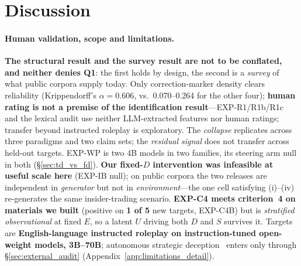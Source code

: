 \section{Discussion}
\label{sec:discussion}

\paragraph{Human validation, scope and limitations.}
\label{sec:icc_caveat}
\label{sec:icc_owned}
\label{sec:transfer_regimes}
\label{sec:blackbox_vs_whitebox}
\label{sec:haiku_defensiveness}
\label{sec:novelty}
\label{sec:protocol_generality}
\label{sec:loo_across_models}
\label{sec:limitations}
\label{sec:interrogation_role}
\label{sec:deployment}
\textbf{The structural result and the survey result are not to be conflated, and neither denies Q1}: the first holds by design, the second is a \emph{survey} of what public corpora supply today. Only correction-marker density clears reliability (Krippendorff's $\alpha\!=\!0.606$, vs.\ 0.070--0.264 for the other four); \textbf{human rating is not a premise of the identification result}---EXP-R1/R1b/R1c and the lexical audit use neither LLM-extracted features nor human ratings; transfer beyond instructed roleplay is exploratory. The \emph{collapse} replicates across three paradigms and two claim sets; the \emph{residual signal} does not transfer across held-out targets. EXP-WP is two 4B models in two families, its steering arm null in both (§\ref{sec:td_vs_fd}). \textbf{Our fixed-$D$ intervention was infeasible at useful scale here} (EXP-IB null); on public corpora the two releases are independent in \emph{generator} but not in \emph{environment}---the one cell satisfying (i)--(iv) re-generates the same insider-trading scenario. \textbf{EXP-C4 meets criterion~4 on materials we built} (positive on \textbf{1 of 5} new targets, EXP-C4B) but is \emph{stratified observational} at fixed $E$, so a latent $U$ driving both $D$ and $S$ survives it. Targets are \textbf{English-language instructed roleplay on instruction-tuned open-weight models, 3B--70B}; autonomous strategic deception~\citep{hubinger2019risks, scheurer2024strategic, greenblatt2024alignment} enters only through §\ref{sec:external_audit} (Appendix~\ref{app:limitations_detail}).
